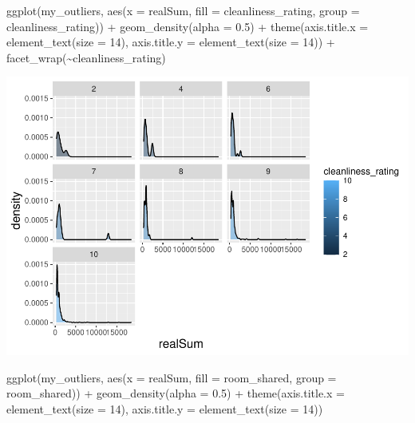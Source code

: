 \documentclass[
]{article}
\newenvironment{Shaded}{\begin{snugshade}}{\end{snugshade}}
\newcommand{\AttributeTok}[1]{\textcolor[rgb]{0.77,0.63,0.00}{#1}}
\newcommand{\DecValTok}[1]{\textcolor[rgb]{0.00,0.00,0.81}{#1}}
\newcommand{\FloatTok}[1]{\textcolor[rgb]{0.00,0.00,0.81}{#1}}
\newcommand{\FunctionTok}[1]{\textcolor[rgb]{0.00,0.00,0.00}{#1}}
\newcommand{\NormalTok}[1]{#1}
\newcommand{\SpecialCharTok}[1]{\textcolor[rgb]{0.00,0.00,0.00}{#1}}
\begin{document}
\begin{Shaded}
\begin{Highlighting}[]
\FunctionTok{ggplot}\NormalTok{(my\_outliers, }\FunctionTok{aes}\NormalTok{(}\AttributeTok{x =}\NormalTok{ realSum, }\AttributeTok{fill =}\NormalTok{ cleanliness\_rating,}
    \AttributeTok{group =}\NormalTok{ cleanliness\_rating)) }\SpecialCharTok{+} \FunctionTok{geom\_density}\NormalTok{(}\AttributeTok{alpha =} \FloatTok{0.5}\NormalTok{) }\SpecialCharTok{+}
    \FunctionTok{theme}\NormalTok{(}\AttributeTok{axis.title.x =} \FunctionTok{element\_text}\NormalTok{(}\AttributeTok{size =} \DecValTok{14}\NormalTok{), }\AttributeTok{axis.title.y =} \FunctionTok{element\_text}\NormalTok{(}\AttributeTok{size =} \DecValTok{14}\NormalTok{)) }\SpecialCharTok{+}
    \FunctionTok{facet\_wrap}\NormalTok{(}\SpecialCharTok{\textasciitilde{}}\NormalTok{cleanliness\_rating)}
\end{Highlighting}
\end{Shaded}

\includegraphics{Project_files/figure-latex/unnamed-chunk-11-1.pdf}

\begin{Shaded}
\begin{Highlighting}[]
\FunctionTok{ggplot}\NormalTok{(my\_outliers, }\FunctionTok{aes}\NormalTok{(}\AttributeTok{x =}\NormalTok{ realSum, }\AttributeTok{fill =}\NormalTok{ room\_shared, }\AttributeTok{group =}\NormalTok{ room\_shared)) }\SpecialCharTok{+}
    \FunctionTok{geom\_density}\NormalTok{(}\AttributeTok{alpha =} \FloatTok{0.5}\NormalTok{) }\SpecialCharTok{+} \FunctionTok{theme}\NormalTok{(}\AttributeTok{axis.title.x =} \FunctionTok{element\_text}\NormalTok{(}\AttributeTok{size =} \DecValTok{14}\NormalTok{),}
    \AttributeTok{axis.title.y =} \FunctionTok{element\_text}\NormalTok{(}\AttributeTok{size =} \DecValTok{14}\NormalTok{))}
\end{Highlighting}
\end{Shaded}
\end{document}
